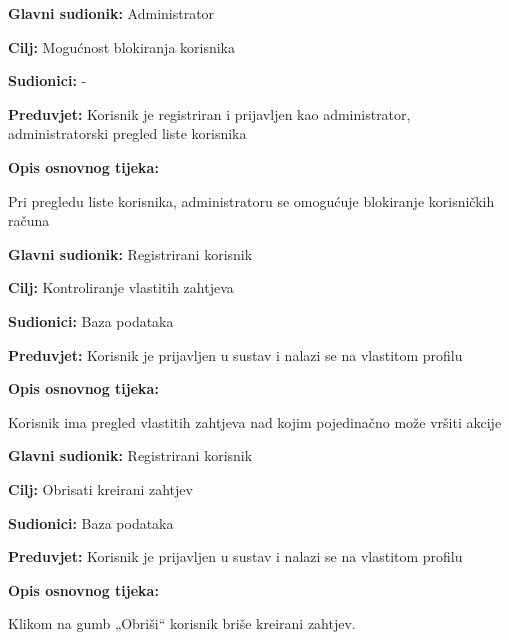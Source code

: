 \noindent {}
\begin{packed_item}
	\item \textbf{Glavni sudionik: }Administrator
	\item  \textbf{Cilj:} Mogućnost blokiranja korisnika
	\item  \textbf{Sudionici:} -
	\item  \textbf{Preduvjet:} Korisnik je registriran i prijavljen kao administrator, administratorski pregled liste korisnika
	\item  \textbf{Opis osnovnog tijeka:}
	
	\item[] \begin{packed_enum}
		
		\item Pri pregledu liste korisnika, administratoru se omogućuje blokiranje korisničkih računa
	\end{packed_enum}
\end{packed_item}

\noindent {}
\begin{packed_item}
	\item \textbf{Glavni sudionik: }Registrirani korisnik
	\item  \textbf{Cilj:} Kontroliranje vlastitih zahtjeva
	\item  \textbf{Sudionici:} Baza podataka
	\item  \textbf{Preduvjet:} Korisnik je prijavljen u sustav i nalazi se na vlastitom profilu
	\item  \textbf{Opis osnovnog tijeka:}
	
	\item[] \begin{packed_enum}
		
		\item 	Korisnik ima pregled  vlastitih zahtjeva nad kojim pojedinačno može vršiti akcije 
	\end{packed_enum}
\end{packed_item}

\noindent {}
\begin{packed_item}
	\item \textbf{Glavni sudionik: }Registrirani korisnik
	\item  \textbf{Cilj:} Obrisati kreirani zahtjev
	\item  \textbf{Sudionici:} Baza podataka
	\item  \textbf{Preduvjet:} Korisnik je prijavljen u sustav i nalazi se na vlastitom profilu
	\item  \textbf{Opis osnovnog tijeka:}
	
	\item[] \begin{packed_enum}
		
		\item 	Klikom na gumb „Obriši“ korisnik briše kreirani zahtjev. 
	\end{packed_enum}
\end{packed_item}

